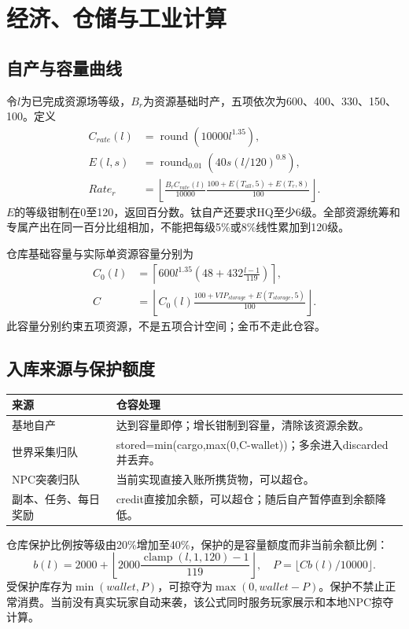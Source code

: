 \chapter{经济、仓储与工业计算}
\section{自产与容量曲线}
令\(l\)为已完成资源场等级，\(B_r\)为资源基础时产，五项依次为600、400、330、150、100。定义
\begin{align}
C_{rate}(l)&=\operatorname{round}(10000l^{1.35}),\\
E(l,s)&=\operatorname{round}_{0.01}\!\left(40s(l/120)^{0.8}\right),\\
Rate_r&=\left\lfloor\frac{B_r C_{rate}(l)}{10000}
 \frac{100+E(T_{all},5)+E(T_r,8)}{100}\right\rfloor.
\end{align}
\(E\)的等级钳制在0至120，返回百分数。钛自产还要求HQ至少6级。全部资源统筹和专属产出在同一百分比组相加，不能把每级5\%或8\%线性累加到120级。

仓库基础容量与实际单资源容量分别为
\begin{align}
C_0(l)&=\left\lceil600l^{1.35}\left(48+432\frac{l-1}{119}\right)\right\rceil,\\
C&=\left\lfloor C_0(l)\frac{100+VIP_{storage}+E(T_{storage},5)}{100}\right\rfloor.
\end{align}
此容量分别约束五项资源，不是五项合计空间；金币不走此仓容。

\section{入库来源与保护额度}
\begin{small}\noindent\begin{tabularx}{\linewidth}{@{}P{30mm}Y@{}}
\toprule 来源 & 仓容处理\\\midrule
基地自产 & 达到容量即停；增长钳制到容量，清除该资源余数。\\
世界采集归队 & stored=min(cargo,max(0,C-wallet))；多余进入discarded并丢弃。\\
NPC突袭归队 & 当前实现直接入账所携货物，可以超仓。\\
副本、任务、每日奖励 & credit直接加余额，可以超仓；随后自产暂停直到余额降低。\\\bottomrule
\end{tabularx}\end{small}

仓库保护比例按等级由20\%增加至40\%，保护的是容量额度而非当前余额比例：
\[
b(l)=2000+\left\lfloor2000\frac{\operatorname{clamp}(l,1,120)-1}{119}\right\rfloor,
\quad P=\lfloor Cb(l)/10000\rfloor.
\]
受保护库存为\(\min(wallet,P)\)，可掠夺为\(\max(0,wallet-P)\)。保护不禁止正常消费。当前没有真实玩家自动来袭，该公式同时服务玩家展示和本地NPC掠夺计算。

